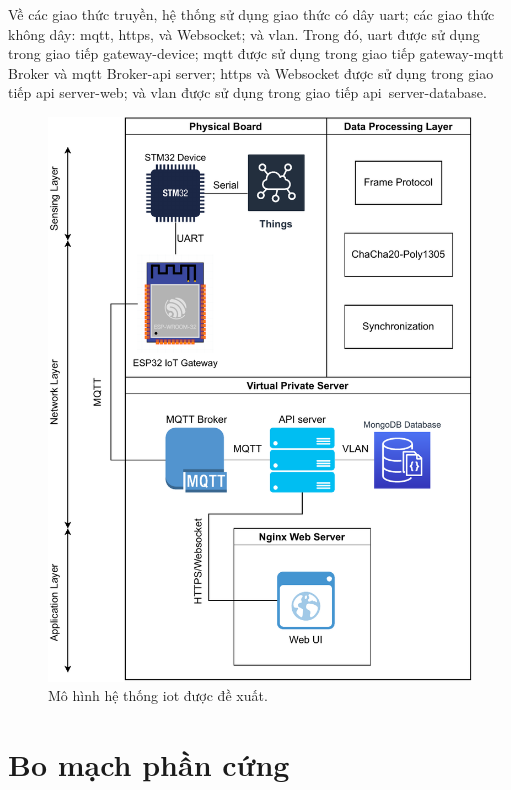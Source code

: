 Về các giao thức truyền, hệ thống sử dụng giao thức có dây \acrfull{uart}; các giao thức không dây: \acrshort{mqtt}, \acrfull{https}, và Websocket; và \acrfull{vlan}. Trong đó, \acrshort{uart} được sử dụng trong giao tiếp gateway-device; \acrshort{mqtt} được sử dụng trong giao tiếp gateway-\acrshort{mqtt} Broker và \acrshort{mqtt} Broker-\acrshort{api} server; \acrshort{https} và Websocket được sử dụng trong giao tiếp \acrshort{api} server-web; và \acrshort{vlan} được sử dụng trong giao tiếp \acrshort{api}~server-database.

\begin{figure}[htp]
\centering
\includegraphics[width=1.0\linewidth]{images/Thesis-Page-8-IoT-Model-Overral.pdf}
\caption{Mô hình hệ thống \acrshort{iot} được đề xuất.}
\label{fig:IoT-Model-Overral}
\end{figure}

\section{Bo mạch phần cứng}

